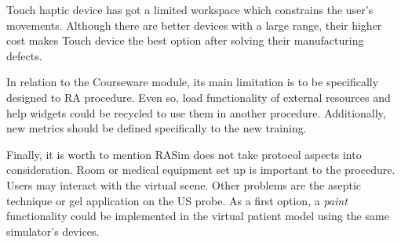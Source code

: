 Touch haptic device has got a limited workspace which constrains the user's movements. Although there are better devices with a large range, their higher cost makes Touch device the best option after solving their manufacturing defects.


In relation to the \acs{Courseware} module, its main limitation is to be specifically designed to \acs{RA} procedure. Even so, load functionality of external resources and help widgets could be recycled to use them in another procedure. Additionally, new metrics should be defined specifically to the new training.


Finally, it is worth to mention \acs{RASim} does not take protocol aspects into consideration. Room or medical equipment set up is important to the procedure. Users may interact with the virtual scene. Other problems are the aseptic technique or gel application on the \acs{US} probe. As a first option, a \emph{paint} functionality could be implemented in the virtual patient model using the same simulator's devices.


